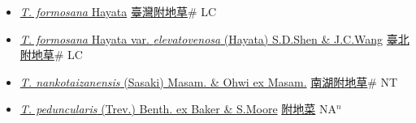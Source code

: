 \begin{itemize}
  \begin{itemize}
        \item[] \href{http://www.theplantlist.org/tpl1.1/search?q=Trigonotis+formosana}{\textit{T. formosana} Hayata}   \href{\detokenize{http://taibnet.sinica.edu.tw/chi/taibnet_species_list.php?T2=臺灣附地草&T2_new_value=true&fr=y}}{臺灣附地草}\# LC
        \item[] \href{http://www.theplantlist.org/tpl1.1/search?q=Trigonotis+formosana+var.+elevatovenosa}{\textit{T. formosana} Hayata var. \textit{elevatovenosa} (Hayata) S.D.Shen \& J.C.Wang}   \href{\detokenize{http://taibnet.sinica.edu.tw/chi/taibnet_species_list.php?T2=臺北附地草&T2_new_value=true&fr=y}}{臺北附地草}\# LC
        \item[] \href{http://www.theplantlist.org/tpl1.1/search?q=Trigonotis+nankotaizanensis}{\textit{T. nankotaizanensis} (Sasaki) Masam. \& Ohwi ex Masam.}   \href{\detokenize{http://taibnet.sinica.edu.tw/chi/taibnet_species_list.php?T2=南湖附地草&T2_new_value=true&fr=y}}{南湖附地草}\# NT
        \item[] \href{http://www.theplantlist.org/tpl1.1/search?q=Trigonotis+peduncularis}{\textit{T. peduncularis} (Trev.) Benth. ex Baker \& S.Moore}   \href{\detokenize{http://taibnet.sinica.edu.tw/chi/taibnet_species_list.php?T2=附地菜&T2_new_value=true&fr=y}}{附地菜} NA$^n$
  \end{itemize}
  \end{itemize}
